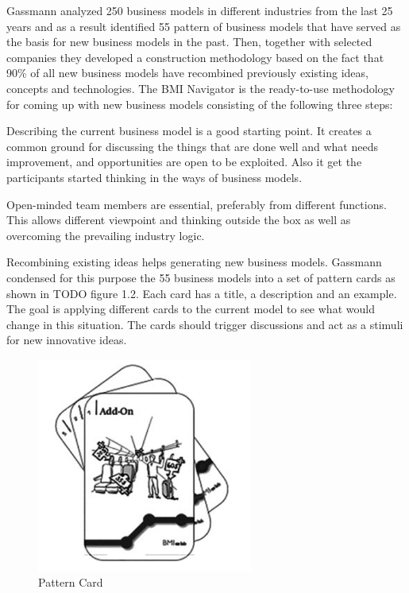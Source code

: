 		Gassmann analyzed 250 business models in different industries from the last 25 years and as a result identified 55 pattern of business models that have served as the basis for new business models in the past. Then, together with selected companies they developed a construction methodology based on the fact that 90\% of all new business models have recombined previously existing ideas, concepts and  technologies. The BMI Navigator is the ready-to-use methodology for coming up with new business models consisting of the following three steps:
					
		Describing the current business model is a good starting point. It creates a common ground for discussing the things that are done well and what needs improvement, and opportunities are open to be exploited. Also it get the participants started thinking in the ways of business models.

		Open-minded team members are essential, preferably from different functions. This allows different viewpoint and thinking outside the box as well as overcoming the prevailing industry logic.
		
		Recombining existing ideas helps generating new business models. Gassmann condensed for this purpose the 55 business models into a set of pattern cards as shown in TODO figure 1.2. Each card has a title, a description and an example. The goal is applying different cards to the current model to see what would change in this situation. The cards should trigger discussions and act as a stimuli for new innovative ideas.
		\begin{figure}[ht]
			    \begin{center}
			    \includegraphics[scale=0.6]{Talk11/Figure2.png}
			    \end{center}
			    \caption{Pattern Card}
			    \label{Pattern Card}
			\end{figure}


